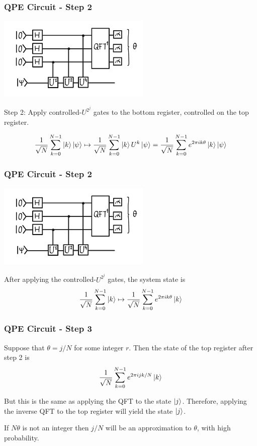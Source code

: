 \documentclass{beamer}
\begin{document}
\begin{frame}
    \frametitle{QPE Circuit - Step 2}
    \includegraphics[height=4cm]{qpe.png}

    Step 2: Apply controlled-$U^{2^j}$ gates to the bottom register, 
    controlled on the top register.
  
    $$\frac{1}{\sqrt{N}} \sum_{k=0}^{N-1} \left| k \right\rangle \left| \psi \right\rangle \mapsto
    \frac{1}{\sqrt{N}} \sum_{k=0}^{N-1} \left| k \right\rangle U^{k} \left| \psi \right\rangle
    = \frac{1}{\sqrt{N}} \sum_{k=0}^{N-1} e^{2\pi i k \theta} \left| k \right\rangle \left| \psi \right\rangle
    $$
\end{frame}

\begin{frame}
    \frametitle{QPE Circuit - Step 2}
    \includegraphics[height=4cm]{qpe.png}

    After applying the controlled-$U^{2^j}$ gates, the system state is
    $$\frac1{\sqrt{N}} \sum_{k=0}^{N-1} \left| k \right\rangle \mapsto 
    \frac1{\sqrt{N}} \sum_{k=0}^{N-1} e^{2\pi ik\theta} \left| k \right\rangle$$
\end{frame}

\begin{frame}
    \frametitle{QPE Circuit - Step 3}

    Suppose that $\theta = j / N$ for some integer $r$.
    Then the state of the top register after step 2 is
    $$\frac1{\sqrt{N}} \sum_{k=0}^{N-1} e^{2\pi ijk/N} \left| k \right\rangle$$

    But this is the same as applying the QFT to the state $\left| j \right\rangle$.
    Therefore, applying the inverse QFT to the top register will yield 
    the state $\left| j \right\rangle$.
 
    \vspace{0.25cm}
 
    If $N\theta$ is not an integer then $j/N$
    will be an approximation to $\theta$, with high probability.
\end{frame}
\end{document}

